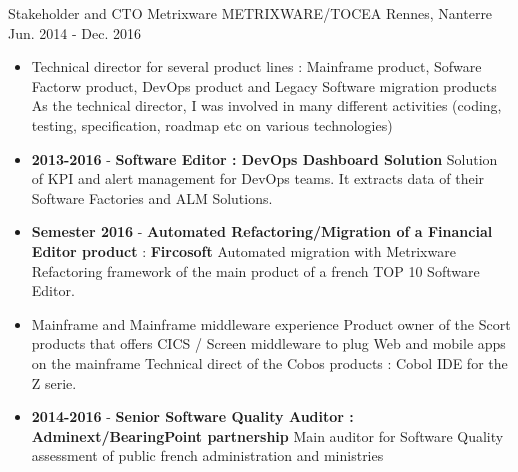 \begin{cventries}
    \cventry
    {Stakeholder and CTO Metrixware} %
    {METRIXWARE/TOCEA} %
    {Rennes, Nanterre} %
    {Jun. 2014 - Dec. 2016} %
    {
        \begin{itemize}
            \item {Technical director for several product lines : Mainframe product, Sofware Factorw product, DevOps product and Legacy Software migration products}
            \subitem As the technical director, I was involved in many different activities (coding, testing, specification, roadmap etc on various technologies)
            \item {\textbf{2013-2016 } - \textbf{Software Editor : DevOps Dashboard Solution} Solution of KPI and alert management for DevOps teams. It extracts data of their Software Factories and ALM Solutions.}
            \item \textbf{Semester 2016} - {\textbf{\textbf{Automated Refactoring/Migration} of a Financial Editor product} : \textbf{Fircosoft} Automated migration with Metrixware Refactoring framework of the main product of a french TOP 10 Software Editor. }            
            \item {Mainframe and Mainframe middleware experience}
            \subitem Product owner of the Scort products that offers CICS / Screen middleware to plug Web and mobile apps on the mainframe
            \subitem Technical direct of the Cobos products : Cobol IDE for the Z serie.
            \item { \textbf{2014-2016 } - \textbf{Senior Software Quality Auditor : Adminext/BearingPoint partnership } Main auditor for Software Quality assessment of public french administration and ministries}
        \end{itemize}
    }


\end{cventries}
